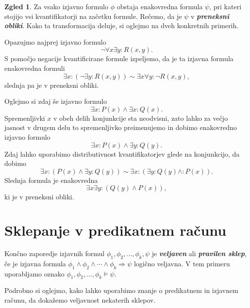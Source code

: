 \documentclass[11pt]{book}
\def\definicija{\color{rdeca}\bf\em}
\theoremstyle{definition}
\theoremstyle{zgled}
\newtheorem*{zgled}{Zgled}
\theoremstyle{odprtproblem}
\theoremstyle{domacanaloga}
\theoremstyle{izrek}
\begin{document}
\begin{zgled}
Za vsako izjavno formulo $\phi$ obstaja enakovredna formula $\psi$, pri kateri stojijo vsi kvantifikatorji na začetku formule. Rečemo, da je $\psi$ v {\definicija preneksni obliki}. Kako ta transformacija deluje, si oglejmo na dveh konkretnih primerih.

Opazujmo najprej izjavno formulo
\[
    \lnot \forall x \exists y \colon R(x,y).
\]
S pomočjo negacije kvantificirane formule izpeljemo, da je ta izjavna formula enakovredna formuli
\[
    \exists x \colon (\lnot \exists y \colon R(x,y))
    \sim \exists x \forall y \colon \lnot R(x,y),
\] 
slednja pa je v preneksni obliki.

Oglejmo si zdaj še izjavno formulo
\[
    \exists x \colon P(x) \land \exists x \colon Q(x).
\]
Spremenljivki $x$ v obeh delih konjunkcije sta neodvisni, zato lahko za večjo jasnost v drugem delu to spremenljivko preimenujemo in dobimo enakovredno izjavno formulo
\[
    \exists x \colon P(x) \land \exists y \colon Q(y).
\]
Zdaj lahko uporabimo distributivnost kvantifikatorjev glede na konjunkcijo, da dobimo 
\[
    \exists x \colon ( P(x) \land \exists y \colon Q(y) )
    \sim 
    \exists x \colon ( \exists y \colon Q(y) \land \colon P(x) ).
\]
Slednja formula je enakovredna
\[
    \exists x \exists y \colon (Q(y) \land P(x)),
\]
ki je v preneksni obliki.
\end{zgled}

\section{Sklepanje v predikatnem računu}

Končno zaporedje izjavnih formul $\phi_1, \phi_2, \dots, \phi_k, \psi$ je {\definicija veljaven} ali {\definicija pravilen sklep}, če je izjavna formula $\phi_1 \land \phi_2 \land \cdots \land \phi_k \Rightarrow \psi$ logično veljavna. V tem primeru uporabljamo oznako $\phi_1, \phi_2, \dots, \phi_k \models \psi$.

Podrobno si oglejmo, kako lahko uporabimo znanje o predikatnem in izjavnem računu, da dokažemo veljavnost nekaterih sklepov.
\end{document}

